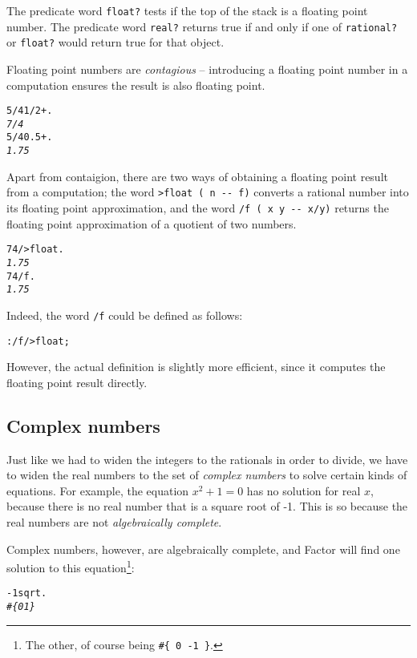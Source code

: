 \documentclass[english]{article}
\begin{document}
The predicate word \texttt{float?} tests if the top of the stack is a floating point number. The predicate word \texttt{real?} returns true if and only if one of \texttt{rational?} or \texttt{float?} would return true for that object.

Floating point numbers are \emph{contagious} -- introducing a floating point number in a computation ensures the result is also floating point.

\begin{alltt}
5/4 1/2 + .
\emph{7/4}
5/4 0.5 + .
\emph{1.75}
\end{alltt}

Apart from contaigion, there are two ways of obtaining a floating point result from a computation; the word \texttt{>float ( n -{}- f)} converts a rational number into its floating point approximation, and the word \texttt{/f ( x y -{}- x/y)} returns the floating point approximation of a quotient of two numbers.

\begin{alltt}
7 4 / >float .
\emph{1.75}
7 4 /f .
\emph{1.75}
\end{alltt}

Indeed, the word \texttt{/f} could be defined as follows:

\begin{alltt}
: /f / >float ;
\end{alltt}

However, the actual definition is slightly more efficient, since it computes the floating point result directly.

\subsection{Complex numbers}

Just like we had to widen the integers to the rationals in order to divide, we have to widen the real numbers to the set of \emph{complex numbers} to solve certain kinds of equations. For example, the equation $x^2 + 1 = 0$ has no solution for real $x$, because there is no real number that is a square root of -1. This is so because the real numbers are not \emph{algebraically complete}. 

Complex numbers, however, are algebraically complete, and Factor will find one solution to this equation\footnote{The other, of course being \texttt{\#\{ 0 -1 \}}.}:

\begin{alltt}
-1 sqrt .
\emph{\#\{ 0 1 \}}
\end{alltt}
\end{document}
